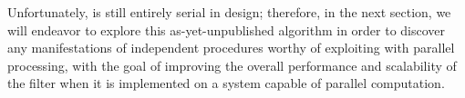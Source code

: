 Unfortunately,  is still entirely serial in design; therefore, in the next section, we will endeavor to explore this as-yet-unpublished algorithm in order to discover any manifestations of independent procedures worthy of exploiting with parallel processing, with the goal of improving the overall performance and scalability of the filter when it is implemented on a system capable of parallel computation.

